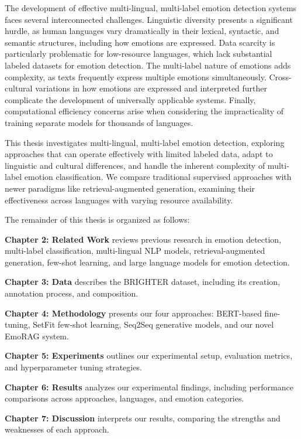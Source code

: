 \documentclass[a4paper,12pt]{extarticle}
\begin{document}
The development of effective multi-lingual, multi-label emotion detection systems faces several interconnected challenges. Linguistic diversity presents a significant hurdle, as human languages vary dramatically in their lexical, syntactic, and semantic structures, including how emotions are expressed. Data scarcity is particularly problematic for low-resource languages, which lack substantial labeled datasets for emotion detection. The multi-label nature of emotions adds complexity, as texts frequently express multiple emotions simultaneously. Cross-cultural variations in how emotions are expressed and interpreted further complicate the development of universally applicable systems. Finally, computational efficiency concerns arise when considering the impracticality of training separate models for thousands of languages.

This thesis investigates multi-lingual, multi-label emotion detection, exploring approaches that can operate effectively with limited labeled data, adapt to linguistic and cultural differences, and handle the inherent complexity of multi-label emotion classification. We compare traditional supervised approaches with newer paradigms like retrieval-augmented generation, examining their effectiveness across languages with varying resource availability.

The remainder of this thesis is organized as follows:

\textbf{Chapter 2: Related Work} reviews previous research in emotion detection, multi-label classification, multi-lingual NLP models, retrieval-augmented generation, few-shot learning, and large language models for emotion detection.

\textbf{Chapter 3: Data} describes the BRIGHTER dataset, including its creation, annotation process, and composition.

\textbf{Chapter 4: Methodology} presents our four approaches: BERT-based fine-tuning, SetFit few-shot learning, Seq2Seq generative models, and our novel EmoRAG system.

\textbf{Chapter 5: Experiments} outlines our experimental setup, evaluation metrics, and hyperparameter tuning strategies.

\textbf{Chapter 6: Results} analyzes our experimental findings, including performance comparisons across approaches, languages, and emotion categories.

\textbf{Chapter 7: Discussion} interprets our results, comparing the strengths and weaknesses of each approach.
\end{document}
